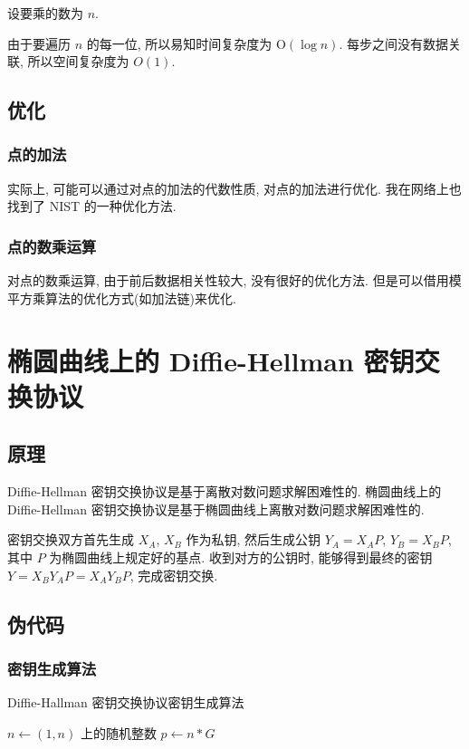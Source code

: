 \documentclass[12pt,a4paper]{article}
\begin{document}
设要乘的数为 $ n $.

由于要遍历 $ n $ 的每一位, 所以易知时间复杂度为 $ \mathrm{O}(\log n) $. 每步之间没有数据关联, 所以空间复杂度为 $ O(1) $.

\subsection*{优化}

\subsubsection*{点的加法}

实际上, 可能可以通过对点的加法的代数性质, 对点的加法进行优化. 我在网络上也找到了 NIST 的一种优化方法. 

\subsubsection*{点的数乘运算}

对点的数乘运算, 由于前后数据相关性较大, 没有很好的优化方法. 但是可以借用模平方乘算法的优化方式(如加法链)来优化. 

\section*{椭圆曲线上的 Diffie-Hellman 密钥交换协议}

\subsection*{原理}

Diffie-Hellman 密钥交换协议是基于离散对数问题求解困难性的. 椭圆曲线上的 Diffie-Hellman 密钥交换协议是基于椭圆曲线上离散对数问题求解困难性的.

密钥交换双方首先生成 $ X_A $, $ X_B $ 作为私钥, 然后生成公钥 $ Y_A = X_A P $, $ Y_B = X_B P $, 其中 $ P $ 为椭圆曲线上规定好的基点. 收到对方的公钥时, 能够得到最终的密钥 $ Y = X_B Y_A P = X_A Y_B P $, 完成密钥交换. 

\subsection*{伪代码}

\subsubsection*{密钥生成算法}

\begin{algorithm}[H]
\caption{Diffie-Hallman 密钥交换协议密钥生成算法}

$ n \leftarrow (1, n) $ 上的随机整数
$ p \leftarrow n * G $
\end{algorithm}
\end{document}
